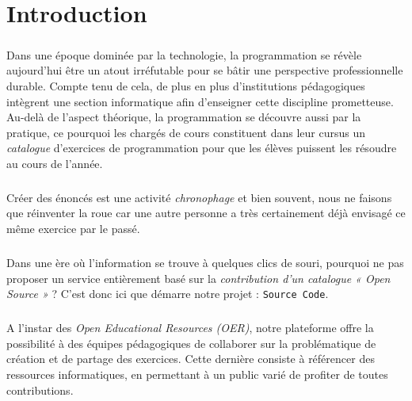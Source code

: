 \chapter{Introduction}

\paragraph{} Dans une époque dominée par la technologie, la programmation se révèle aujourd’hui être un atout irréfutable pour se bâtir une perspective professionnelle durable. Compte tenu de cela, de plus en plus d’institutions pédagogiques intègrent une section informatique afin d’enseigner cette discipline prometteuse. Au-delà de l’aspect théorique, la programmation se découvre aussi par la pratique, ce pourquoi les chargés de cours constituent dans leur cursus un \textit{catalogue} d’exercices de programmation pour que les élèves puissent les résoudre au cours de l'année. 

\paragraph{} Créer des énoncés est une activité \textit{chronophage} et bien souvent, nous ne faisons que réinventer la roue car une autre personne a très certainement déjà envisagé ce même exercice par le passé.

\paragraph{} Dans une ère où l’information se trouve à quelques clics de souri, pourquoi ne pas proposer un service entièrement basé sur la \textit{contribution d’un catalogue « Open Source »} ? C’est donc ici que démarre notre projet : \texttt{Source Code}.

\paragraph{} A l’instar des \textit{Open Educational Resources (OER)}, notre plateforme offre la possibilité à des équipes pédagogiques de collaborer sur la problématique de création et de partage des exercices. Cette dernière consiste à référencer des ressources informatiques, en permettant à un public varié de profiter de toutes contributions. 
